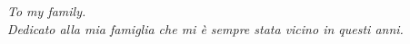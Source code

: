 \documentclass[a4paper,titlepage,oneside,10pt]{book}
\begin{document}
\newpage
\thispagestyle{empty}
\newpage
\begin{center}
\textit{To my family.}\\
\textit{Dedicato alla mia famiglia che mi \`e sempre stata vicino in questi anni.}
\end{center}
\newpage
\thispagestyle{empty}
\null
\newpage
{}\setcounter{page}{1}
\tableofcontents
\mainmatter


\setcounter{page}{4}
%
\setcounter{page}{8}





\cleardoublepage

\cleardoublepage
{}




\listoffigures
\cleardoublepage

\listoftables
\cleardoublepage

\end{document}
